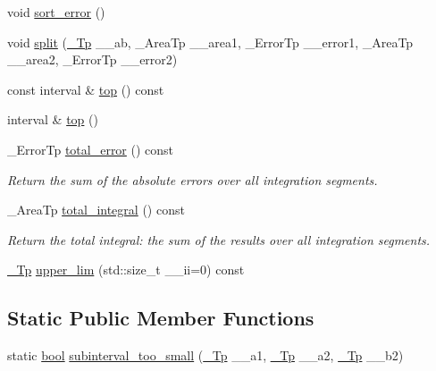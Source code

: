 \begin{DoxyCompactItemize}
\item 
void \hyperlink{class____gnu__cxx_1_1integration__workspace_a01fe84e753d4654433b27bb35495c8aa}{sort\+\_\+error} ()
\item 
void \hyperlink{class____gnu__cxx_1_1integration__workspace_ab230bc53a2b794e466516b690f8bf90b}{split} (\hyperlink{namespace____gnu__cxx_a3b19a9c800ca194374ef9172290f7d79}{\+\_\+\+Tp} \+\_\+\+\_\+ab, \+\_\+\+Area\+Tp \+\_\+\+\_\+area1, \+\_\+\+Error\+Tp \+\_\+\+\_\+error1, \+\_\+\+Area\+Tp \+\_\+\+\_\+area2, \+\_\+\+Error\+Tp \+\_\+\+\_\+error2)
\item 
const interval \& \hyperlink{class____gnu__cxx_1_1integration__workspace_ad04bd21f3292fa2d0093412f97e969b4}{top} () const
\item 
interval \& \hyperlink{class____gnu__cxx_1_1integration__workspace_adc576b6ed1386c0b1c5eeae6040abf96}{top} ()
\item 
\+\_\+\+Error\+Tp \hyperlink{class____gnu__cxx_1_1integration__workspace_af321cc49c560b2a78dff70c350db020c}{total\+\_\+error} () const
\begin{DoxyCompactList}\small\item\em Return the sum of the absolute errors over all integration segments. \end{DoxyCompactList}\item 
\+\_\+\+Area\+Tp \hyperlink{class____gnu__cxx_1_1integration__workspace_a8453bc74f14f20a4ceab0b735718bbae}{total\+\_\+integral} () const
\begin{DoxyCompactList}\small\item\em Return the total integral\+: the sum of the results over all integration segments. \end{DoxyCompactList}\item 
\hyperlink{namespace____gnu__cxx_a3b19a9c800ca194374ef9172290f7d79}{\+\_\+\+Tp} \hyperlink{class____gnu__cxx_1_1integration__workspace_ac4b398d0af1711c00b6859ca8933b858}{upper\+\_\+lim} (std\+::size\+\_\+t \+\_\+\+\_\+ii=0) const
\end{DoxyCompactItemize}
\subsection*{Static Public Member Functions}
\begin{DoxyCompactItemize}
\item 
static \hyperlink{namespace____gnu__cxx_ae83aca57f97767d5d09188718728a0ac}{bool} \hyperlink{class____gnu__cxx_1_1integration__workspace_a56057c37b02b717d5f582bdaafea62e5}{subinterval\+\_\+too\+\_\+small} (\hyperlink{namespace____gnu__cxx_a3b19a9c800ca194374ef9172290f7d79}{\+\_\+\+Tp} \+\_\+\+\_\+a1, \hyperlink{namespace____gnu__cxx_a3b19a9c800ca194374ef9172290f7d79}{\+\_\+\+Tp} \+\_\+\+\_\+a2, \hyperlink{namespace____gnu__cxx_a3b19a9c800ca194374ef9172290f7d79}{\+\_\+\+Tp} \+\_\+\+\_\+b2)
\end{DoxyCompactItemize}


